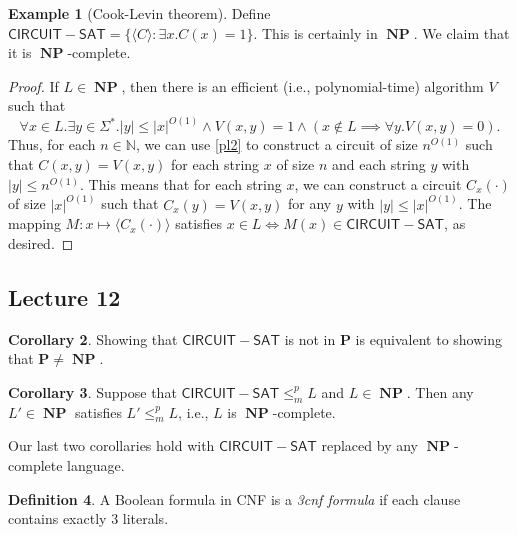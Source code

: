 \documentclass[10pt,letterpaper,cm]{nupset}
\theoremstyle{definition}
\newtheorem{definition}{Definition}[subsection]
\newtheorem{exmp}[definition]{Example}
\theoremstyle{theorem}
\newtheorem{corollary}[definition]{Corollary}
\theoremstyle{remark}
\newcommand{\N}{\mathbb N}
\newcommand{\1}{\mathbf{1}}
\newcommand{\0}{\vec 0}
\DeclareMathOperator{\NP}{\mathbf{NP}}
\begin{document}
\begin{exmp}[Cook-Levin theorem]
Define $\mathsf{CIRCUIT{-}SAT} = \{ \langle C \rangle : \exists x. C(x) = 1\}$. This is certainly in $\NP$. We claim that it is $\NP$-complete.
\end{exmp}
\begin{proof}
If $L \in \NP$, then there is an efficient (i.e.,  polynomial-time) algorithm $V$ such that $$\forall x\in L.\exists y\in \Sigma^{\ast}.\lvert{y}\rvert\leq \lvert{x}\rvert^{O(1)} \land V(x,y) =1 \land (x\notin L \implies \forall y. V(x,y)=0).$$ Thus, for each $n\in \N$, we can use \cref{pl2} to construct a circuit of size $n^{O(1)}$ such that $C(x,y) = V(x,y)$ for each string $x$ of size $n$ and each string $y$ with $\lvert{y}\rvert\leq n^{O(1)}$. This means that for each string $x$, we can construct a circuit $C_x(\cdot)$ of size $\lvert{x}\rvert^{O(1)}$ such that $C_x(y) = V(x,y)$ for any $y$ with $\lvert{y}\rvert\leq \lvert{x}\rvert^{O(1)}$. The mapping $M: x\mapsto \langle C_x(\cdot) \rangle$ satisfies $x\in L \iff M(x) \in \mathsf{CIRCUIT{-}SAT}$, as desired.  
\end{proof}

\subsection{Lecture 12}

\begin{corollary}
Showing that $\mathsf{CIRCUIT{-}SAT}$ is not in $\mathbf{P}$ is equivalent to showing that $\mathbf{P} \ne \NP$.
\end{corollary}

\begin{corollary}
Suppose that $\mathsf{CIRCUIT{-}SAT} \leq_m^p L$ and $L\in \NP$. Then any $L' \in \NP$ satisfies $L' \leq_m^p L$, i.e., $L$ is $\NP$-complete.
\end{corollary}

\smallskip

Our last two corollaries hold with $\mathsf{CIRCUIT{-}SAT}$ replaced by any $\NP$-complete language. 

\smallskip

\begin{definition}
A Boolean formula in CNF is a \textit{3cnf formula} if each clause contains exactly $3$ literals.  
\end{definition}
\end{document}
